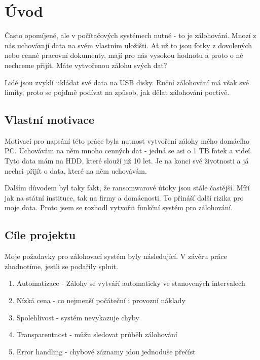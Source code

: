 \documentclass[a4paper,12pt, oneside]{book}
\begin{document}
\tableofcontents

\clearpage
\pagestyle{fancy}

\chapter{Úvod}

Často opomíjené, ale v počítačových systémech nutné - to je zálohování.
Mnozí z nás uchovávají data na svém vlastním uložišti. Ať už to jsou
fotky z dovolených nebo cenné pracovní dokumenty, mají pro nás vysokou hodnotu
a proto o ně nechceme přijít. Máte vytvořenou zálohu svých dat? 

Lidé jsou zvyklí ukládat své data na USB disky. Ruční zálohování má však své limity,
proto se pojďmě podívat na způsob, jak dělat zálohování poctivě.


\section{Vlastní motivace}

Motivací pro napsání této práce byla nutnost vytvoření zálohy mého
domácího PC. Uchovávám na něm mnoho cenných dat -
jedná se asi o 1 TB fotek a videí. Tyto data mám na HDD, které
slouží již 10 let. Je na konci své životnosti a já nechci přijít o data,
které na něm uchovávám. 

Dalším důvodem byl taky fakt, že ransomwarové útoky jsou stále častější. Míří
jak na státní instituce, tak na firmy a domácnosti. To přináší další rizika pro
moje data. Proto jsem se rozhodl vytvořit funkční systém 
pro zálohování.




\section{Cíle projektu}

Moje požadavky pro zálohovací systém byly následující. V závěru práce zhodnotíme, 
jestli se podařily splnit.

\begin{enumerate}
	\item Automatizace - Zálohy se vytváří automaticky ve stanovených intervalech
	\item Nízká cena - co nejmenší počáteční i provozní náklady
	\item Spolehlivost - systém nevykazuje chyby
	\item Transparentnost - můžu sledovat průběh zálohování
	\item Error handling - chybové záznamy jdou jednoduše přečíst
\end{enumerate}
\end{document}
